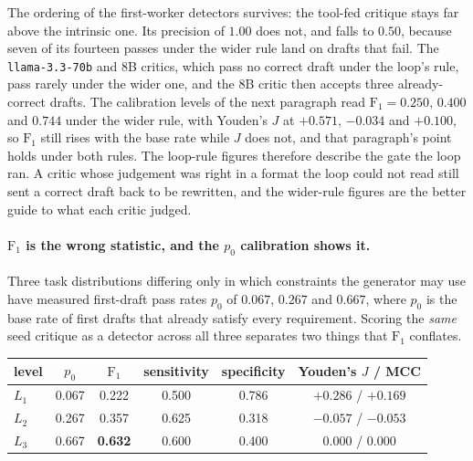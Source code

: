 \documentclass[11pt]{article}
\begin{document}
\noindent
The ordering of the first-worker detectors survives: the tool-fed critique stays far above the
intrinsic one. Its precision of $1.00$ does not, and falls to $0.50$, because seven of its
fourteen passes under the wider rule land on drafts that fail. The \texttt{llama-3.3-70b} and 8B
critics, which pass no correct draft under the loop's rule, pass rarely under the wider one, and
the 8B critic then accepts three already-correct drafts. The calibration levels of the next paragraph read
$\mathrm{F}_1 = 0.250$, $0.400$ and $0.744$ under the wider rule, with Youden's $J$ at $+0.571$,
$-0.034$ and $+0.100$, so $\mathrm{F}_1$ still rises with the base rate while $J$ does not, and
that paragraph's point holds under both rules. The loop-rule figures therefore describe the
gate the loop ran. A critic whose judgement was right in a format the loop could not read still
sent a correct draft back to be rewritten, and the wider-rule figures are the better guide to what
each critic judged.

\paragraph{$\mathrm{F}_1$ is the wrong statistic, and the $p_0$ calibration shows it.}
Three task distributions differing only in which
constraints the generator may use have measured first-draft pass rates $p_0$ of $0.067$,
$0.267$ and $0.667$, where $p_0$ is the base rate of first drafts that already satisfy every
requirement. Scoring the \emph{same} seed critique as a detector across all three
separates two things that $\mathrm{F}_1$ conflates.

\begin{center}\small
\begin{tabular}{lccccc}
\toprule
level & $p_0$ & $\mathrm{F}_1$ & sensitivity & specificity & Youden's $J$ / MCC \\
\midrule
$L_1$ & 0.067 & 0.222 & 0.500 & 0.786 & $+0.286$ / $+0.169$ \\
$L_2$ & 0.267 & 0.357 & 0.625 & 0.318 & $-0.057$ / $-0.053$ \\
$L_3$ & 0.667 & \textbf{0.632} & 0.600 & 0.400 & $\mathbf{0.000}$ / $\mathbf{0.000}$ \\
\bottomrule
\end{tabular}
\end{center}
\end{document}
